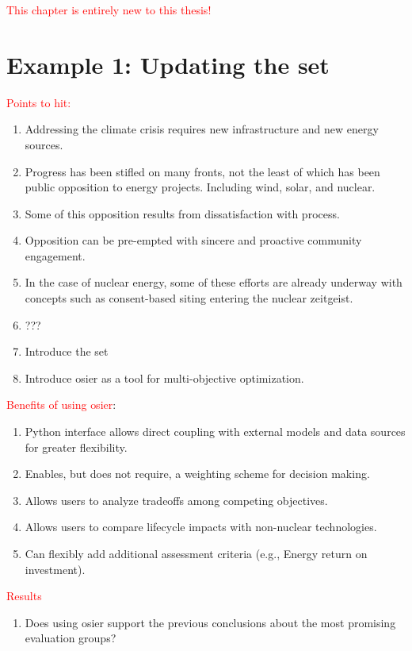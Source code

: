 
\textcolor{red}{This chapter is entirely new to this thesis!}

\section{Example 1: Updating the \ac{set}}

\textcolor{red}{Points to hit:}
\begin{enumerate}
    \item Addressing the climate crisis requires new infrastructure and new energy sources.
    \item Progress has been stifled on many fronts, not the least of which has been public opposition to energy projects. Including wind, solar, and nuclear.
    \item Some of this opposition results from dissatisfaction with process.
    \item Opposition can be pre-empted with sincere and proactive community engagement.
    \item In the case of nuclear energy, some of these efforts are already underway with concepts such as consent-based siting entering the nuclear zeitgeist.
    \item ???
    \item Introduce the \ac{set}
    \item  Introduce \ac{osier} as a tool for multi-objective optimization.
\end{enumerate}

\textcolor{red}{Benefits of using \ac{osier}}:
\begin{enumerate}
    \item Python interface allows direct coupling with external models and data sources for greater flexibility.
    \item Enables, but does not require, a weighting scheme for decision making.
    \item Allows users to analyze tradeoffs among competing objectives.
    \item Allows users to compare lifecycle impacts with non-nuclear technologies.
    \item Can flexibly add additional assessment criteria (e.g., Energy return on investment). 
\end{enumerate}

\textcolor{red}{Results}
\begin{enumerate}
    \item Does using \ac{osier} support the previous conclusions about the most promising evaluation groups?
\end{enumerate}

